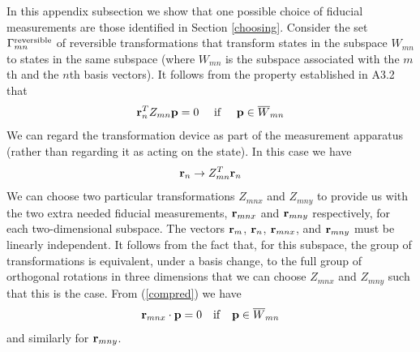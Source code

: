 \documentclass[12pt]{article}
\begin{document}
\vspace{4mm}


\vspace{4mm}

In this appendix subsection we show that one possible choice of fiducial
measurements are those identified in Section \ref{choosing}.
Consider the set $\Gamma_{mn}^{\rm reversible}$ of reversible
transformations that transform states in the subspace $W_{mn}$ to states
in the same subspace (where $W_{mn}$ is the subspace associated with the
$m$th and the $n$th basis vectors).
It follows from the property established in A3.2 that
\begin{equation}\label{compred}
{\bf r}^T_n Z_{mn} {\bf p} = 0 ~~~~{\rm if}~~~~ {\bf p}\in
\overline{W}_{mn}
\end{equation}
We can regard the transformation device as part of the measurement
apparatus (rather than regarding it as acting on the state).  In this
case we have
\begin{equation}
{\bf r}_n\rightarrow Z^T_{mn} {\bf r}_n
\end{equation}
We can choose two particular transformations $Z_{mnx}$ and $Z_{mny}$ to
provide us with the two extra needed fiducial measurements, ${\bf
r}_{mnx}$ and ${\bf r}_{mny}$ respectively,  for each two-dimensional
subspace.  The vectors ${\bf r}_m$, ${\bf r}_n$, ${\bf r}_{mnx}$, and
${\bf r}_{mny}$ must be linearly independent.  It follows from the
fact that, for this subspace, the group of transformations is
equivalent, under a basis change, to the full group of orthogonal rotations
in three dimensions that we
can choose $Z_{mnx}$ and $Z_{mny}$ such that this is the case.
From (\ref{compred}) we have
\begin{equation}\label{useful}
{\bf r}_{mnx} \cdot {\bf p} = 0 ~~~{\rm if}~~~ {\bf p}\in \overline{W}_{mn}
\end{equation}
and similarly for ${\bf r}_{mny}$.
\end{document}
